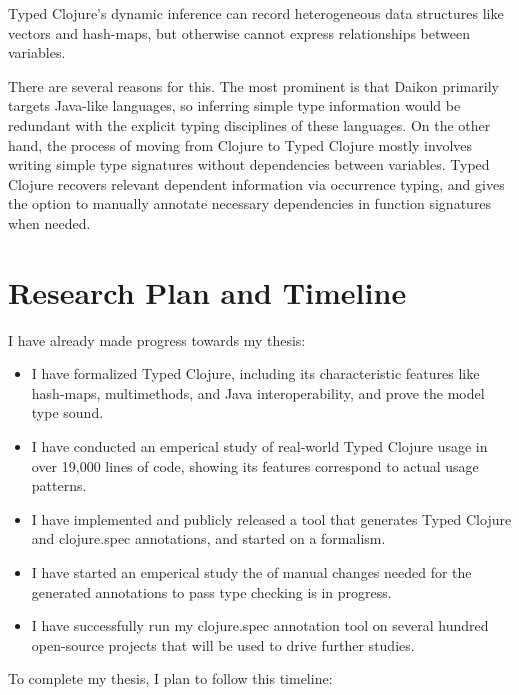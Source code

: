 \documentclass[9pt]{extarticle}
\begin{document}
Typed Clojure's dynamic inference can record heterogeneous data structures
like vectors and hash-maps, but otherwise cannot express relationships
between variables.

There are several reasons for this. The most prominent is that Daikon
primarily targets Java-like languages, so inferring simple type information
would be redundant with the explicit typing disciplines of these languages.
On the other hand, the process of moving from Clojure to Typed Clojure
mostly involves writing simple type signatures without dependencies
between variables. Typed Clojure recovers relevant dependent information
via occurrence typing, and gives the option to manually annotate necessary
dependencies in function signatures when needed.


\section{Research Plan and Timeline}

I have already made progress towards my thesis:

\begin{itemize}
	\item I have formalized Typed Clojure, including
		its characteristic features like hash-maps, multimethods, and Java interoperability,
		and prove the model type sound.
  \item I have conducted an emperical study of real-world Typed Clojure usage
    in over 19,000 lines of code, showing its features correspond to actual usage patterns.
  \item I have implemented and publicly released a tool that generates
    Typed Clojure and clojure.spec annotations, and started on a formalism.
	\item I have started an emperical study the of manual changes needed for the generated annotations
    to pass type checking is in progress.
	\item I have successfully run my clojure.spec annotation tool on several hundred open-source projects that
		will be used to drive further studies.
\end{itemize}

To complete my thesis, I plan to follow this timeline:
\end{document}
